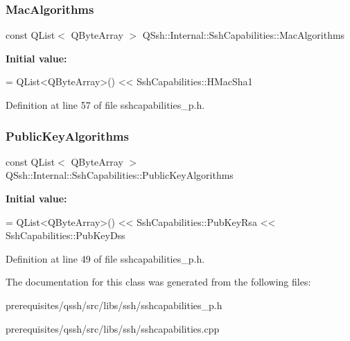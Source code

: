 \subsubsection{\texorpdfstring{Mac\+Algorithms}{MacAlgorithms}}
{\footnotesize\ttfamily const Q\+List$<$ Q\+Byte\+Array $>$ Q\+Ssh\+::\+Internal\+::\+Ssh\+Capabilities\+::\+Mac\+Algorithms\hspace{0.3cm}{\ttfamily [static]}}

{\bfseries Initial value\+:}
\begin{DoxyCode}
= QList<QByteArray>() 
        << SshCapabilities::HMacSha1
\end{DoxyCode}


Definition at line 57 of file sshcapabilities\+\_\+p.\+h.

\mbox{\label{class_q_ssh_1_1_internal_1_1_ssh_capabilities_a865f63a08349b61f986fd5c5bdfba066}} 
\subsubsection{\texorpdfstring{Public\+Key\+Algorithms}{PublicKeyAlgorithms}}
{\footnotesize\ttfamily const Q\+List$<$ Q\+Byte\+Array $>$ Q\+Ssh\+::\+Internal\+::\+Ssh\+Capabilities\+::\+Public\+Key\+Algorithms\hspace{0.3cm}{\ttfamily [static]}}

{\bfseries Initial value\+:}
\begin{DoxyCode}
= QList<QByteArray>() << SshCapabilities::PubKeyRsa
          << SshCapabilities::PubKeyDss
\end{DoxyCode}


Definition at line 49 of file sshcapabilities\+\_\+p.\+h.



The documentation for this class was generated from the following files\+:\begin{DoxyCompactItemize}
\item 
prerequisites/qssh/src/libs/ssh/sshcapabilities\+\_\+p.\+h\item 
prerequisites/qssh/src/libs/ssh/sshcapabilities.\+cpp\end{DoxyCompactItemize}
